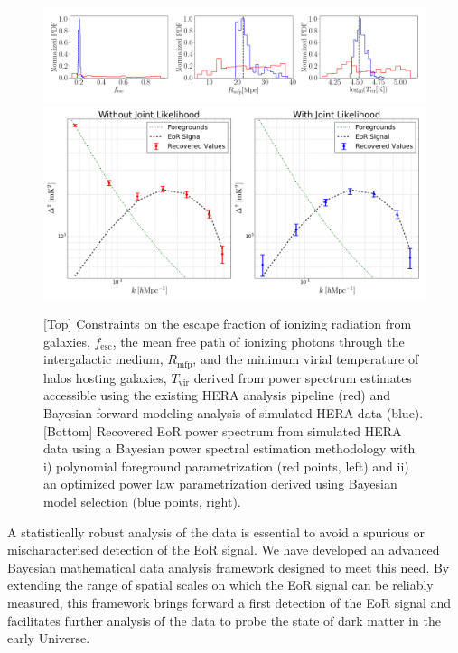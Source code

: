\documentclass[a0,landscape]{a0poster}
\begin{document}
\begin{multicols}{4}
\vspace{-1.0cm}
\begin{figure}[H]
\begin{centering}
\includegraphics[width=0.9\linewidth]{Astro_constraints_lowk_comparison_3.png}\\
\vspace{-0.3cm}
{\includegraphics[width=0.9\linewidth]{JF_twopanel.png}}
\vspace{-0.1cm}
\caption{[Top] Constraints on the escape fraction of ionizing radiation from galaxies, $f_\mathrm{esc}$, the mean free path of ionizing photons through the intergalactic medium, $R_\mathrm{mfp}$, and the minimum virial temperature of halos hosting galaxies, $T_\mathrm{vir}$ derived from power spectrum estimates accessible using the existing HERA analysis pipeline (red) and Bayesian forward modeling analysis of simulated HERA data (blue). [Bottom] Recovered EoR power spectrum from simulated HERA data using a Bayesian power spectral estimation methodology with i) polynomial foreground parametrization (red points, left) and ii) an optimized power law parametrization derived using Bayesian model selection (blue points, right).}
\label{SphericalPSofEoRplusFgs_with_CylindricalFgPrior}
\end{centering}
\end{figure}

A statistically robust analysis of the data is essential to avoid a spurious or mischaracterised detection of the EoR signal. We have developed an advanced Bayesian mathematical data analysis framework designed to meet this need. By extending the range of spatial scales on which the EoR signal can be reliably measured, this framework brings forward a first detection of the EoR signal and facilitates further analysis of the data to probe the state of dark matter in the early Universe.






\end{multicols}
\end{document}
